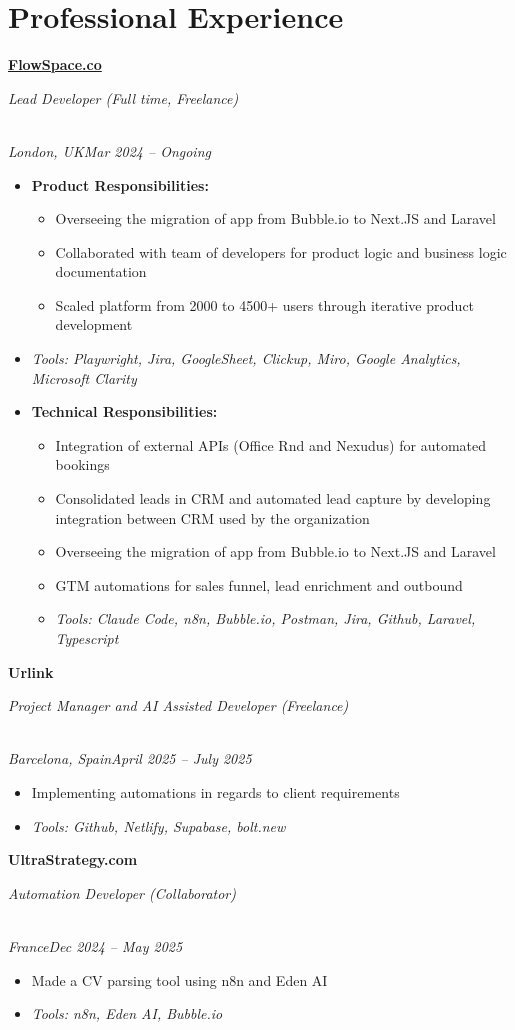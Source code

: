 \documentclass[a4paper,10pt]{article}
\newcommand{\role}[4]{\vspace{3pt}\noindent\hspace{0.6em}\parbox[t]{0.38\textwidth}{\raggedright\textbf{#1}}\hfill\parbox[t]{0.58\textwidth}{\raggedleft\textit{#2}}\\{\textit{#3}\hfill\textit{#4}}\vspace{1pt}}
\begin{document}
\section{Professional Experience}
\role{\href{https://flowspace.co}{FlowSpace.co}}{Lead Developer (Full time, Freelance)}{London, UK}{Mar 2024 -- Ongoing}
\begin{itemize}
\item \textbf{Product Responsibilities:}
\begin{itemize}[label=--]
\item Overseeing the migration of app from Bubble.io to Next.JS and Laravel
\item Collaborated with team of developers for product logic and business logic documentation
\item Scaled platform from 2000 to 4500+ users through iterative product development
\end{itemize}
\item \textit{Tools: Playwright, Jira, GoogleSheet, Clickup, Miro, Google Analytics, Microsoft Clarity}
\item \textbf{Technical Responsibilities:}
\begin{itemize}[label=--]
\item Integration of external APIs (Office Rnd and Nexudus) for automated bookings
\item Consolidated leads in CRM and automated lead capture by developing integration between CRM used by the organization
\item Overseeing the migration of app from Bubble.io to Next.JS and Laravel
\item GTM automations for sales funnel, lead enrichment and outbound
\item \textit{Tools: Claude Code, n8n, Bubble.io, Postman, Jira, Github, Laravel, Typescript}
\end{itemize}
\end{itemize}

\role{Urlink}{Project Manager and AI Assisted Developer (Freelance)}{Barcelona, Spain}{April 2025 -- July 2025}
\begin{itemize}
\item Implementing automations in regards to client requirements
\item \textit{Tools: Github, Netlify, Supabase, bolt.new}
\end{itemize}

\role{UltraStrategy.com}{Automation Developer (Collaborator)}{France}{Dec 2024 -- May 2025}
\begin{itemize}
\item Made a CV parsing tool using n8n and Eden AI
\item \textit{Tools: n8n, Eden AI, Bubble.io}
\end{itemize}
\end{document}
